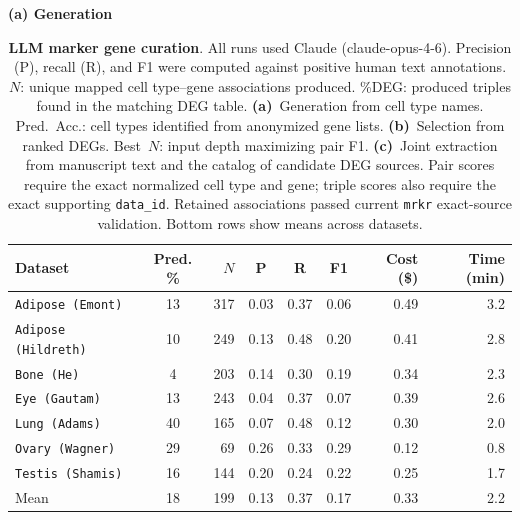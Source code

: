 \documentclass[10pt,twocolumn]{article}
\theoremstyle{plain}
\theoremstyle{definition}
\theoremstyle{remark}
\begin{document}
\begin{table}[ht!]
  \centering
  \caption{\textbf{LLM marker gene curation}. All runs used Claude (claude-opus-4-6). Precision (P), recall (R), and F1 were computed against positive human text annotations. \textbf{$N$}: unique mapped cell type--gene associations produced. \%DEG: produced triples found in the matching DEG table. \textbf{(a)}~Generation from cell type names. Pred.\ Acc.: cell types identified from anonymized gene lists. \textbf{(b)}~Selection from ranked DEGs. Best~$N$: input depth maximizing pair F1. \textbf{(c)}~Joint extraction from manuscript text and the catalog of candidate DEG sources. Pair scores require the exact normalized cell type and gene; triple scores also require the exact supporting \texttt{data\_id}. Retained associations passed current \texttt{mrkr} exact-source validation. Bottom rows show means across datasets.}
  \label{tab:llm_curation}%
  \small
  \setlength{\tabcolsep}{4pt}

  \textbf{(a) Generation}
  \vspace{2pt}

  \begin{tabular}{@{}l c r ccc r r@{}}
  \toprule
  Dataset & Pred. \% & $N$ & P & R & F1 & Cost (\$) & Time (min) \\
  \midrule
  \texttt{Adipose (Emont)}    & 13 & 317 & 0.03 & 0.37 & 0.06 & 0.49 & 3.2 \\
  \texttt{Adipose (Hildreth)} & 10 & 249 & 0.13 & 0.48 & 0.20 & 0.41 & 2.8 \\
  \texttt{Bone (He)}          & 4  & 203 & 0.14 & 0.30 & 0.19 & 0.34 & 2.3 \\
  \texttt{Eye (Gautam)}       & 13 & 243 & 0.04 & 0.37 & 0.07 & 0.39 & 2.6 \\
  \texttt{Lung (Adams)}       & 40 & 165 & 0.07 & 0.48 & 0.12 & 0.30 & 2.0 \\
  \texttt{Ovary (Wagner)}     & 29 &  69 & 0.26 & 0.33 & 0.29 & 0.12 & 0.8 \\
  \texttt{Testis (Shamis)}    & 16 & 144 & 0.20 & 0.24 & 0.22 & 0.25 & 1.7 \\
  \midrule
  Mean               & 18 & 199 & 0.13 & 0.37 & 0.17 & 0.33 & 2.2 \\
  \bottomrule
  \end{tabular}



\end{table}
\end{document}
